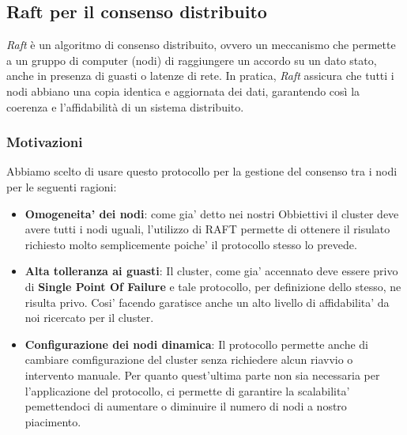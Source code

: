 \subsection{Raft per il consenso distribuito}
\textit{Raft} è un algoritmo di consenso distribuito, ovvero un meccanismo che permette 
a un gruppo di computer (nodi) di raggiungere un accordo su un dato stato, 
anche in presenza di guasti o latenze di rete. In pratica, 
\textit{Raft} assicura che tutti i nodi abbiano una copia identica e 
aggiornata dei dati, garantendo così la coerenza e l'affidabilità di un sistema distribuito.

\subsubsection{Motivazioni}
Abbiamo scelto di usare questo protocollo per la gestione del consenso tra i nodi per
le seguenti ragioni:
\begin{itemize}
    \item \textbf{Omogeneita' dei nodi}: 
        come gia' detto nei nostri Obbiettivi il cluster deve avere tutti i nodi uguali, 
        l'utilizzo di RAFT permette di ottenere il risulato richiesto molto semplicemente poiche'
        il protocollo stesso lo prevede.
    \item \textbf{Alta tolleranza ai guasti}: 
        Il cluster, come gia' accennato deve essere privo di \textbf{Single Point Of Failure} e
        tale protocollo, per definizione dello stesso, ne risulta privo. 
        Cosi' facendo garatisce anche un alto livello di affidabilita' da noi ricercato per il 
        cluster.
    \item \textbf{Configurazione dei nodi dinamica}: 
        Il protocollo permette anche di cambiare comfigurazione del cluster senza richiedere
        alcun riavvio o intervento manuale. Per quanto quest'ultima
        parte non sia necessaria per l'applicazione del protocollo, ci permette di garantire
        la scalabilita' pemettendoci di aumentare o diminuire il numero di 
        nodi a nostro piacimento.
\end{itemize}

